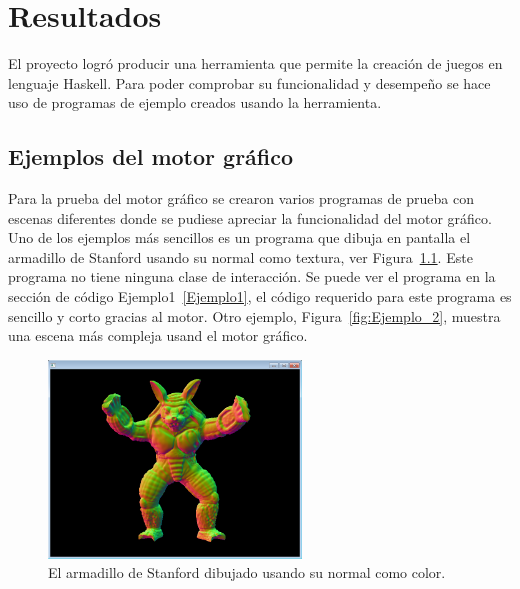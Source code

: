 
\chapter{Resultados}
\label{capitulo5}

\ifpdf
    \graphicspath{{resultados/Figs/Raster/}{resultados/Figs/PDF/}{resultados/Figs/}}
\else
    \graphicspath{{resultados/Figs/Vector/}{resultados/Figs/}}
\fi

El proyecto logró producir una herramienta que permite la creación de juegos en lenguaje Haskell. Para poder comprobar su funcionalidad y desempeño se hace uso de programas de ejemplo creados usando la herramienta.

\section{Ejemplos del motor gráfico}

Para la prueba del motor gráfico se crearon varios programas de prueba con escenas diferentes donde se pudiese apreciar la funcionalidad del motor gráfico. Uno de los ejemplos más sencillos es un programa que dibuja en pantalla el armadillo de Stanford usando su normal como textura, ver Figura~\ref{fig:Ejemplo_1}. Este programa no tiene ninguna clase de interacción. Se puede ver el programa en la sección de código Ejemplo1~\ref{Ejemplo1}, el código requerido para este programa es sencillo y corto gracias al motor. Otro ejemplo, Figura~\ref{fig:Ejemplo_2}, muestra una escena más compleja usand el motor gráfico.

\begin{figure}[!ht!]
\centering
\includegraphics[width=0.6\textwidth]{armadillo}
\caption[Ejemplo 1]{El armadillo de Stanford dibujado usando su normal como color.}
\label{fig:Ejemplo_1}
\end{figure}

